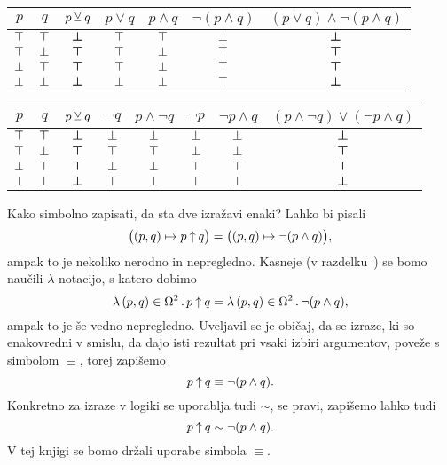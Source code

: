 		\begin{center}
			\begin{tabular}{cc|ccccc}
				$p$ & $q$ & $p \mathbin{\veebar} q$ & $p \lor q$ & $p \land q$ & $\lnot(p \land q)$ & $(p \lor q) \land \lnot(p \land q)$  \\
				\hline
				$\top$ & $\top$ & $\bm{\bot}$ & $\top$ & $\top$ & $\bot$ & $\bm{\bot}$ \\
				$\top$ & $\bot$ & $\bm{\top}$ & $\top$ & $\bot$ & $\top$ & $\bm{\top}$ \\
				$\bot$ & $\top$ & $\bm{\top}$ & $\top$ & $\bot$ & $\top$ & $\bm{\top}$ \\
				$\bot$ & $\bot$ & $\bm{\bot}$ & $\bot$ & $\bot$ & $\top$ & $\bm{\bot}$
			\end{tabular}
		\end{center}
		
		\begin{center}
			\begin{tabular}{cc|cccccc}
				$p$ & $q$ & $p \mathbin{\veebar} q$ & $\lnot{q}$ & $p \land \lnot{q}$ & $\lnot{p}$ & $\lnot{p} \land q$ & $(p \land \lnot{q}) \lor (\lnot{p} \land q)$  \\
				\hline
				$\top$ & $\top$ & $\bm{\bot}$ & $\bot$ & $\bot$ & $\bot$ & $\bot$ & $\bm{\bot}$ \\
				$\top$ & $\bot$ & $\bm{\top}$ & $\top$ & $\top$ & $\bot$ & $\bot$ & $\bm{\top}$ \\
				$\bot$ & $\top$ & $\bm{\top}$ & $\bot$ & $\bot$ & $\top$ & $\top$ & $\bm{\top}$ \\
				$\bot$ & $\bot$ & $\bm{\bot}$ & $\top$ & $\bot$ & $\top$ & $\bot$ & $\bm{\bot}$
			\end{tabular}
		\end{center}
		
		Kako simbolno zapisati, da sta dve izražavi enaki? Lahko bi pisali
		\[\big((p, q) \mapsto p \mathbin{\uparrow} q\big) = \big((p, q) \mapsto \lnot(p \land q)\big),\]
		ampak to je nekoliko nerodno in nepregledno. Kasneje (v razdelku~) se bomo naučili $\lambda$-notacijo, s katero dobimo
		\[\xlam{(p, q)}[\tvs^2]{p \shf q} = \xlam{(p, q)}[\tvs^2]{\lnot(p \land q)},\]
		ampak to je še vedno nepregledno. Uveljavil se je običaj, da se izraze, ki so enakovredni v smislu, da dajo isti rezultat pri vsaki izbiri argumentov, poveže s simbolom $\equiv$, torej zapišemo
		\[p \mathbin{\uparrow} q \equiv \lnot(p \land q).\]
		Konkretno za izraze v logiki se uporablja tudi $\sim$, se pravi, zapišemo lahko tudi
		\[p \mathbin{\uparrow} q \sim \lnot(p \land q).\]
		V tej knjigi se bomo držali uporabe simbola $\equiv$. 
		
